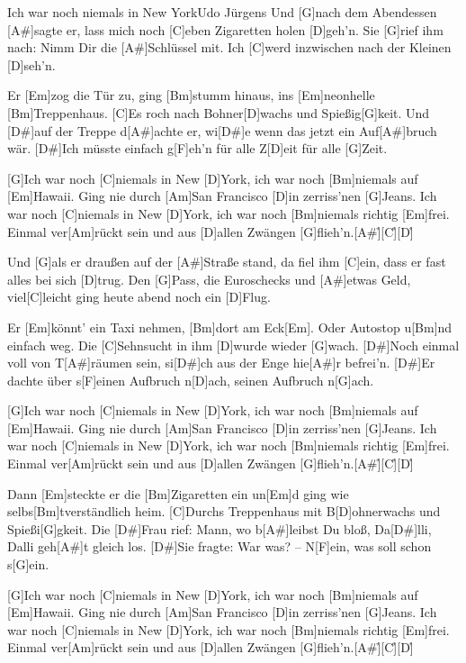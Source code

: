 \documentclass[../main.tex]{subfiles}
\begin{document}
\begin{song}[3]{Ich war noch niemals in New York}{Udo Jürgens}{}
Und [G]nach dem Abendessen [A#]sagte er,
lass mich noch [C]eben Zigaretten holen [D]geh'n.
Sie [G]rief ihm nach: Nimm Dir die [A#]Schlüssel mit.
Ich [C]werd inzwischen nach der Kleinen [D]seh'n.

Er [Em]zog die Tür zu, ging [Bm]stumm hinaus,
ins [Em]neonhelle [Bm]Treppenhaus.
[C]Es roch nach Bohner[D]wachs und Spießig[G]keit.
Und [D#]auf der Treppe d[A#]achte er, wi[D#]e wenn das jetzt ein Auf[A#]bruch wär.
[D#]Ich müsste einfach g[F]eh'n für alle Z[D]eit
für alle [G]Zeit.

[G]Ich war noch [C]niemals in New [D]York, ich war noch [Bm]niemals auf [Em]Hawaii.
Ging nie durch [Am]San Francisco [D]in zerriss'nen [G]Jeans.
Ich war noch [C]niemals in New [D]York, ich war noch [Bm]niemals richtig [Em]frei.
Einmal ver[Am]rückt sein und aus [D]allen Zwängen [G]flieh'n.[A#]{\h}[C]{\h}[D]{\h}

Und [G]als er draußen auf der [A#]Straße stand,
da fiel ihm [C]ein, dass er fast alles bei sich [D]trug.
Den [G]Pass, die Euroschecks und [A#]etwas Geld,
viel[C]leicht ging heute abend noch ein [D]Flug.

Er [Em]könnt' ein Taxi nehmen, [Bm]dort am Eck[Em]. Oder Autostop u[Bm]nd einfach weg.
Die [C]Sehnsucht in ihm [D]wurde wieder [G]wach.
[D#]Noch einmal voll von T[A#]räumen sein, si[D#]ch aus der Enge hie[A#]r befrei'n.
[D#]Er dachte über s[F]einen Aufbruch n[D]ach, seinen Aufbruch n[G]ach.

[G]Ich war noch [C]niemals in New [D]York, ich war noch [Bm]niemals auf [Em]Hawaii.
Ging nie durch [Am]San Francisco [D]in zerriss'nen [G]Jeans.
Ich war noch [C]niemals in New [D]York, ich war noch [Bm]niemals richtig [Em]frei.
Einmal ver[Am]rückt sein und aus [D]allen Zwängen [G]flieh'n.[A#]{\h}[C]{\h}[D]{\h}

Dann [Em]steckte er die [Bm]Zigaretten ein un[Em]d ging wie selbs[Bm]tverständlich heim.
[C]Durchs Treppenhaus mit B[D]ohnerwachs und Spießi[G]gkeit.
Die [D#]Frau rief: \glqq{}Mann, wo b[A#]leibst Du bloß, Da[D#]lli, Dalli geh[A#]t gleich los.\grqq{}
[D#]Sie fragte: \glqq{}War was?\grqq{} -- \glqq{}N[F]ein, was soll schon s[G]ein.\grqq{}

[G]Ich war noch [C]niemals in New [D]York, ich war noch [Bm]niemals auf [Em]Hawaii.
Ging nie durch [Am]San Francisco [D]in zerriss'nen [G]Jeans.
Ich war noch [C]niemals in New [D]York, ich war noch [Bm]niemals richtig [Em]frei.
Einmal ver[Am]rückt sein und aus [D]allen Zwängen [G]flieh'n.[A#]{\h}[C]{\h}[D]{\h}

\end{song}
\end{document}
